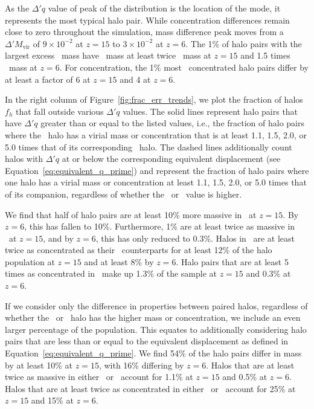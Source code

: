 As the $\Delta' q$ value of peak of the distribution is the location of the mode, it represents the most typical halo pair.  While concentration differences remain close to zero throughout the simulation, mass difference peak moves from a $\Delta' M_{\mathrm{vir}}$ of $9 \times 10^{-2}$ at $z = 15$ to $3 \times 10^{-2}$ at $z = 6$.  The 1\% of halo pairs with the largest excess \lpt\ mass have \lpt\ mass at least twice \za\ mass at $z = 15$ and 1.5 times \za\ mass at $z = 6$.  For concentration, the 1\% most \lpt\ concentrated halo pairs differ by at least a factor of 6 at $z = 15$ and 4 at $z = 6$.

In the right column of Figure~\ref{fig:frac_err_trends}, we plot the fraction of halos $f_{h}$ that fall outside various $\Delta' q$ values.  The solid lines represent halo pairs that have $\Delta' q$ greater than or equal to the listed values, i.e., the fraction of halo pairs where the \lpt\ halo has a virial mass or concentration that is at least 1.1, 1.5, 2.0, or 5.0 times that of its corresponding \za\ halo.  The dashed lines additionally count halos with $\Delta' q$ at or below the corresponding equivalent displacement (see Equation~\ref{eq:equivalent_q_prime}) and represent the fraction of halo pairs where one halo has a virial mass or concentration at least 1.1, 1.5, 2.0, or 5.0 times that of its companion, regardless of whether the \lpt\ or \za\ value is higher.

We find that half of halo pairs are at least 10\% more massive in \lpt\ at $z = 15$.  By $z = 6$, this has fallen to 10\%.  Furthermore, 1\% are at least twice as massive in \lpt\ at $z = 15$, and by $z = 6$, this has only reduced to 0.3\%.  Halos in \lpt\ are at least twice as concentrated as their \za\ counterparts for at least 12\% of the halo population at $z = 15$ and at least 8\% by $z = 6$.  Halo pairs that are at least 5 times as concentrated in \lpt\ make up 1.3\% of the sample at $z = 15$ and 0.3\% at $z = 6$.

If we consider only the difference in properties between paired halos, regardless of whether the \lpt\ or \za\ halo has the higher mass or concentration, we include an even larger percentage of the population.   This equates to additionally considering halo pairs that are less than or equal to the equivalent displacement as defined in Equation~\ref{eq:equivalent_q_prime}.  We find 54\% of the halo pairs differ in mass by at least 10\% at $z = 15$, with 16\% differing by $z = 6$.  Halos that are at least twice as massive in either \lpt\ or \za\ account for 1.1\% at $z = 15$ and 0.5\% at $z = 6$.  Halos that are at least twice as concentrated in either \lpt\ or \za\ account for 25\% at $z = 15$ and 15\% at $z = 6$.




